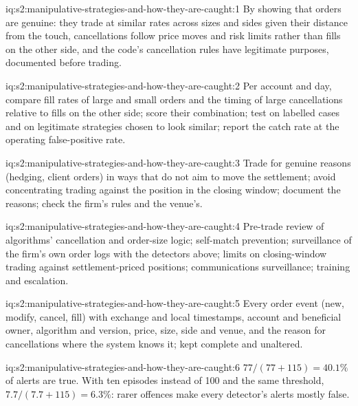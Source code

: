 \begin{solution}{iq:s2:manipulative-strategies-and-how-they-are-caught:1}
By showing that orders are genuine: they trade at similar rates across sizes and sides given their distance from the touch, cancellations follow price
moves and risk limits rather than fills on the other side, and the code's cancellation rules have legitimate purposes, documented before trading.
\end{solution}

\begin{solution}{iq:s2:manipulative-strategies-and-how-they-are-caught:2}
Per account and day, compare fill rates of large and small orders and the timing of large cancellations relative to fills on the other side; score
their combination; test on labelled cases and on legitimate strategies chosen to look similar; report the catch rate at the operating false-positive
rate.
\end{solution}

\begin{solution}{iq:s2:manipulative-strategies-and-how-they-are-caught:3}
Trade for genuine reasons (hedging, client orders) in ways that do not aim to move the settlement; avoid concentrating trading against the position in
the closing window; document the reasons; check the firm's rules and the venue's.
\end{solution}

\begin{solution}{iq:s2:manipulative-strategies-and-how-they-are-caught:4}
Pre-trade review of algorithms' cancellation and order-size logic; self-match prevention; surveillance of the firm's own order logs with the detectors
above; limits on closing-window trading against settlement-priced positions; communications surveillance; training and escalation.
\end{solution}

\begin{solution}{iq:s2:manipulative-strategies-and-how-they-are-caught:5}
Every order event (new, modify, cancel, fill) with exchange and local timestamps, account and beneficial owner, algorithm and version, price, size,
side and venue, and the reason for cancellations where the system knows it; kept complete and unaltered.
\end{solution}

\begin{solution}{iq:s2:manipulative-strategies-and-how-they-are-caught:6}
$77/(77 + 115) = 40.1\%$ of alerts are true. With ten episodes instead of 100 and the same threshold, $7.7/(7.7 + 115) = 6.3\%$: rarer offences make
every detector's alerts mostly false.
\end{solution}
